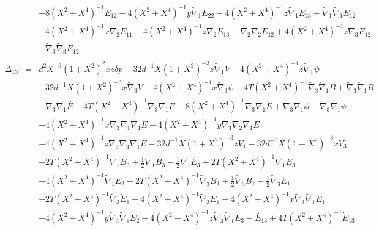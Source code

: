 \documentclass[10pt,letterpaper]{article}
\numberwithin{equation}{section}
\begin{document}
\begin{appendices}
\begin{eqnarray}
&& - 8 (X^2 + X^4)^{-1} E_{12} - 4 (X^2 + X^4)^{-1} y \tilde{\nabla}_{1}E_{22} - 4 (X^2 + X^4)^{-1} z \tilde{\nabla}_{1}E_{23} + \tilde{\nabla}_{1}\tilde{\nabla}_{1}E_{12} \nonumber \\ 
&& - 4 (X^2 + X^4)^{-1} x \tilde{\nabla}_{2}E_{11} - 4 (X^2 + X^4)^{-1} z \tilde{\nabla}_{2}E_{13} + \tilde{\nabla}_{2}\tilde{\nabla}_{2}E_{12} + 4 (X^2 + X^4)^{-1} z \tilde{\nabla}_{3}E_{12} \nonumber \\ 
&& + \tilde{\nabla}_{3}\tilde{\nabla}_{3}E_{12}
\\  \nonumber\\ 
\Delta_{13}&=& d^2 X^{-6} (1 + X^2)^2 x z \delta p - 32 d^{-1} X (1 + X^2)^{-3} z \tilde{\nabla}_{1}V + 4 (X^2 + X^4)^{-1} z \tilde{\nabla}_{1}\psi \nonumber \\ 
&& - 32 d^{-1} X (1 + X^2)^{-3} x \tilde{\nabla}_{3}V + 4 (X^2 + X^4)^{-1} x \tilde{\nabla}_{3}\psi - 4 T (X^2 + X^4)^{-1} \tilde{\nabla}_{3}\tilde{\nabla}_{1}B + \tilde{\nabla}_{3}\tilde{\nabla}_{1}\dot{B} \nonumber \\ 
&& -  \tilde{\nabla}_{3}\tilde{\nabla}_{1}\overset{..}{E} + 4 T (X^2 + X^4)^{-1} \tilde{\nabla}_{3}\tilde{\nabla}_{1}\dot{E} - 8 (X^2 + X^4)^{-1} \tilde{\nabla}_{3}\tilde{\nabla}_{1}E + \tilde{\nabla}_{3}\tilde{\nabla}_{1}\phi -  \tilde{\nabla}_{3}\tilde{\nabla}_{1}\psi \nonumber \\ 
&& - 4 (X^2 + X^4)^{-1} x \tilde{\nabla}_{3}\tilde{\nabla}_{1}\tilde{\nabla}_{1}E - 4 (X^2 + X^4)^{-1} y \tilde{\nabla}_{3}\tilde{\nabla}_{2}\tilde{\nabla}_{1}E \nonumber \\ 
&& - 4 (X^2 + X^4)^{-1} z \tilde{\nabla}_{3}\tilde{\nabla}_{3}\tilde{\nabla}_{1}E-32 d^{-1} X (1 + X^2)^{-3} z V_{1} - 32 d^{-1} X (1 + X^2)^{-3} x V_{3} \nonumber \\ 
&& - 2 T (X^2 + X^4)^{-1} \tilde{\nabla}_{1}B_{3} + \tfrac{1}{2} \tilde{\nabla}_{1}\dot{B}_{3} -  \tfrac{1}{2} \tilde{\nabla}_{1}\overset{..}{E}_{3} + 2 T (X^2 + X^4)^{-1} \tilde{\nabla}_{1}\dot{E}_{3} \nonumber \\ 
&& - 4 (X^2 + X^4)^{-1} \tilde{\nabla}_{1}E_{3} - 2 T (X^2 + X^4)^{-1} \tilde{\nabla}_{3}B_{1} + \tfrac{1}{2} \tilde{\nabla}_{3}\dot{B}_{1} -  \tfrac{1}{2} \tilde{\nabla}_{3}\overset{..}{E}_{1} \nonumber \\ 
&& + 2 T (X^2 + X^4)^{-1} \tilde{\nabla}_{3}\dot{E}_{1} - 4 (X^2 + X^4)^{-1} \tilde{\nabla}_{3}E_{1} - 4 (X^2 + X^4)^{-1} x \tilde{\nabla}_{3}\tilde{\nabla}_{1}E_{1} \nonumber \\ 
&& - 4 (X^2 + X^4)^{-1} y \tilde{\nabla}_{3}\tilde{\nabla}_{1}E_{2} - 4 (X^2 + X^4)^{-1} z \tilde{\nabla}_{3}\tilde{\nabla}_{1}E_{3}- \overset{..}{E}_{13} + 4 T (X^2 + X^4)^{-1} \dot{E}_{13} \nonumber \\ 

\end{eqnarray}
\end{appendices}
\end{document}
